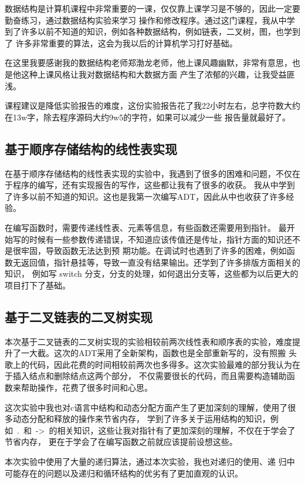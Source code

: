\documentclass[supercite]{Experimental_Report}
\theoremstyle{definition}
\begin{document}
数据结构是计算机课程中非常重要的一课，仅仅靠上课学习是不够的，因此一定要勤奋练习，通过数据结构实验来学习
操作和修改程序。通过这门课程，我从中学到了许多以前不知道的知识，例如各种数据结构，例如链表，二叉树，图，也学到了
许多非常重要的算法，这会为我以后的计算机学习打好基础。

在这里我要感谢我的数据结构老师郑渤龙老师，他上课风趣幽默，非常有意思，也是他这种上课风格让我对数据结构和大数据方面
产生了浓郁的兴趣，让我受益匪浅。

课程建议是降低实验报告的难度，这份实验报告花了我22小时左右，总字符数大约在13w字，除去程序源码大约9w5的字符，如果可以减少一些
报告量就最好了。
\subsection{基于顺序存储结构的线性表实现}

在基于顺序存储结构的线性表实现的实验中，我遇到了很多的困难和问题，不仅在于程序的编写，还有实现报告的写作，这些都让我有了很多的收获。
我从中学到了许多以前不知道的知识。这也是我第一次编写ADT，因此从中也收获了许多经验。

在编写函数时，需要传递线性表、元素等信息，有些函数还需要用到指针。
最开始写的时候有一些参数传递错误，不知道应该传值还是传址，指针方面的知识还不是很牢固，导致函数无法达到预
期功能。在调试时也遇到了许多的困难，例如函数无返回值，指针悬挂等，导致一直没有结果输出。还学到了许多排版方面相关的知识，
例如写 switch 分支，分支的处理，如何退出分支等，这些都为以后更大的项目打下了基础。

\subsection{基于二叉链表的二叉树实现}

本次基于二叉链表的二叉树实现的实验相较前两次线性表和顺序表的实验，难度提升了一大截。这次的ADT采用了全新架构，函数也是全部重新写的，没有照搬
头歌上的代码，因此花费的时间相较前两次也多得多。这次实验最难的部分我认为在于插入结点和删除结点这两个部分，
不仅需要很长的代码，而且需要构造辅助函数来帮助操作，花费了很多时间和心思。

这次实验中我也对c语言中结构和动态分配方面产生了更加深刻的理解，使用了很多动态分配和释放的操作来节省内存，
学到了许多关于运用结构的知识，例如\ .\ 和\ ->\ 的相关知识，这些让我对指针有了更加深刻的理解，不仅在于学会了节省内存，
更在于学会了在编写函数之前就应该提前设想这些。

本次实验中使用了大量的递归算法，通过本次实验，我也对递归的使用、递
归中可能存在的问题以及递归和循环结构的优劣有了更加直观的认识。
\end{document}
